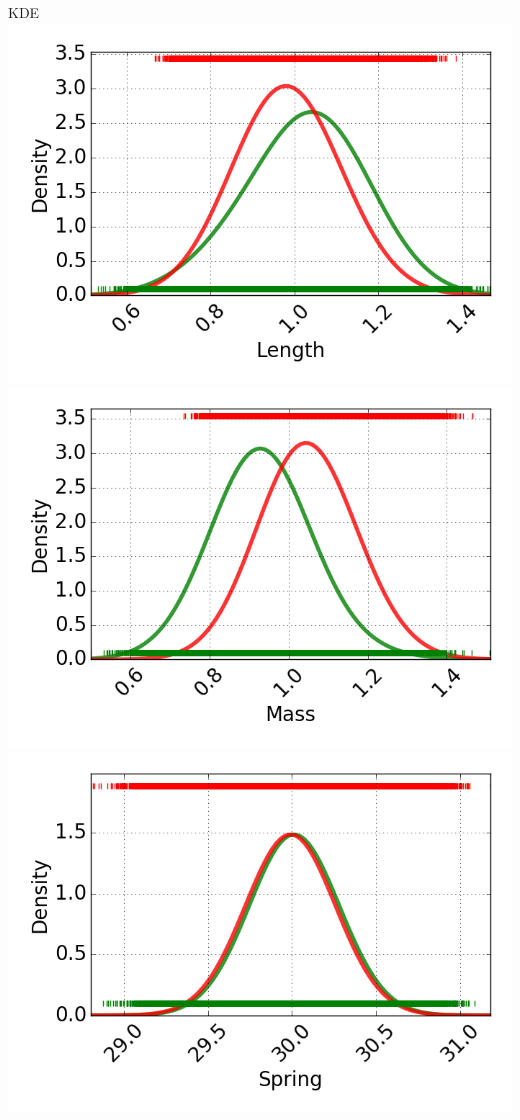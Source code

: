 \documentclass{beamer}
\begin{document}
\begin{frame}{KDE}
\\
\vspace{10 pt}
\includegraphics[scale=0.22]{images/KDE_Length.png}
\includegraphics[scale=0.22]{images/KDE_Mass.png}
\includegraphics[scale=0.22]{images/KDE_Spring.png}
\end{frame}
\end{document}
